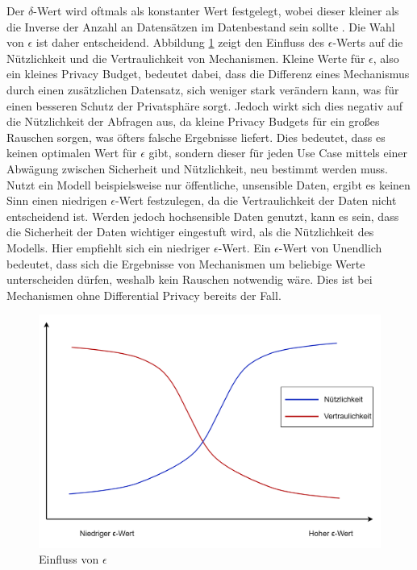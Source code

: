 Der $\delta$-Wert wird oftmals als konstanter Wert festgelegt, wobei dieser kleiner als die Inverse der Anzahl an Datensätzen im Datenbestand sein sollte \cite{P-27}.
Die Wahl von $\epsilon$ ist daher entscheidend. 
Abbildung \ref{fig:dp_privacy_budget} zeigt den Einfluss des $\epsilon$-Werts auf die Nützlichkeit und die Vertraulichkeit von Mechanismen.
Kleine Werte für $\epsilon$, also ein kleines Privacy Budget, bedeutet dabei, dass die Differenz eines Mechanismus durch einen zusätzlichen Datensatz, sich weniger stark verändern kann, was für einen besseren Schutz der Privatsphäre sorgt.
Jedoch wirkt sich dies negativ auf die Nützlichkeit der Abfragen aus, da kleine Privacy Budgets für ein großes Rauschen sorgen, was öfters falsche Ergebnisse liefert.
Dies bedeutet, dass es keinen optimalen Wert für $\epsilon$ gibt, sondern dieser für jeden Use Case mittels einer Abwägung zwischen Sicherheit und Nützlichkeit, neu bestimmt werden muss.
Nutzt ein Modell beispielsweise nur öffentliche, unsensible Daten, ergibt es keinen Sinn einen niedrigen $\epsilon$-Wert festzulegen, da die Vertraulichkeit der Daten nicht entscheidend ist.
Werden jedoch hochsensible Daten genutzt, kann es sein, dass die Sicherheit der Daten wichtiger eingestuft wird, als die Nützlichkeit des Modells. 
Hier empfiehlt sich ein niedriger $\epsilon$-Wert.
Ein $\epsilon$-Wert von Unendlich bedeutet, dass sich die Ergebnisse von Mechanismen um beliebige Werte unterscheiden dürfen, weshalb kein Rauschen notwendig wäre. 
Dies ist bei Mechanismen ohne Differential Privacy bereits der Fall.

\begin{figure}[!htb]
    \centering
    \includegraphics[width=12cm]{figures/dp_privacy_budget.png}
    \caption{Einfluss von $\epsilon$}
    \label{fig:dp_privacy_budget}
\end{figure} 

